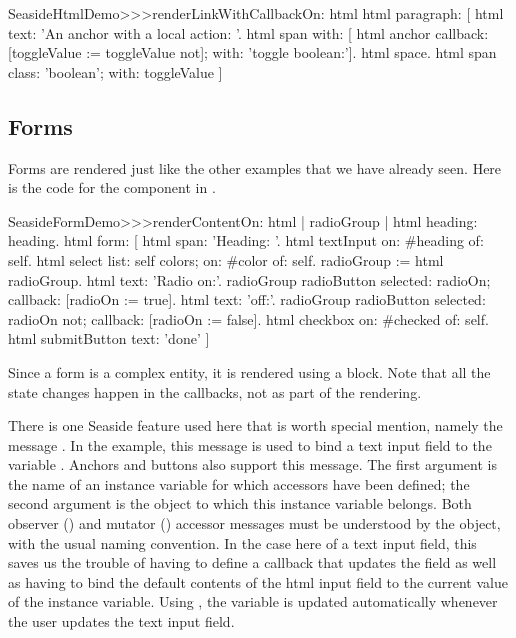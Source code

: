 \documentclass[a4paper,10pt,twoside]{book}
\begin{document}
{{
\begin{code}{}
SeasideHtmlDemo>>>renderLinkWithCallbackOn: html 
	html paragraph: [
		html text: 'An anchor with a local action: '.
		html span with: [
			html anchor
				callback: [toggleValue := toggleValue not];
				with: 'toggle boolean:'].
		html space.
		html span
			class: 'boolean';
			with: toggleValue ]
\end{code}


\subsection{Forms}

Forms are rendered just like the other examples that we have already seen.
Here is the code for the  component in .

\begin{code}{}
SeasideFormDemo>>>renderContentOn: html
	| radioGroup |
	html heading: heading.
	html form: [
		html span: 'Heading: '.
		html textInput on: #heading of: self.
		html select
			list: self colors;
			on: #color of: self.
		radioGroup := html radioGroup.
		html text: 'Radio on:'.
		radioGroup radioButton
			selected: radioOn;
			callback: [radioOn := true].
		html text: 'off:'.
		radioGroup radioButton
			selected: radioOn not;
			callback: [radioOn := false].
		html checkbox on: #checked of: self.
		html submitButton
			text: 'done' ]
\end{code}{}

Since a form is a complex entity, it is rendered using a block.
Note that all the state changes happen in the callbacks, not as part of the rendering.

There is one Seaside feature used here that is worth special mention, namely the message .
In the example, this message is used to bind a text input field to the variable .
Anchors and buttons also support this message.
The first argument is the name of an instance variable for which accessors have been defined;  the second argument is the object to which this instance variable belongs.
Both observer () and mutator () accessor messages must be understood by the object, with the usual naming convention.
In the case here of a text input field, this saves us the trouble of having to define a callback that updates the field as well as having to bind the default contents of the html input field to the current value of the instance variable.
Using , the  variable is updated automatically whenever the user updates the text input field.

}}
\end{document}
